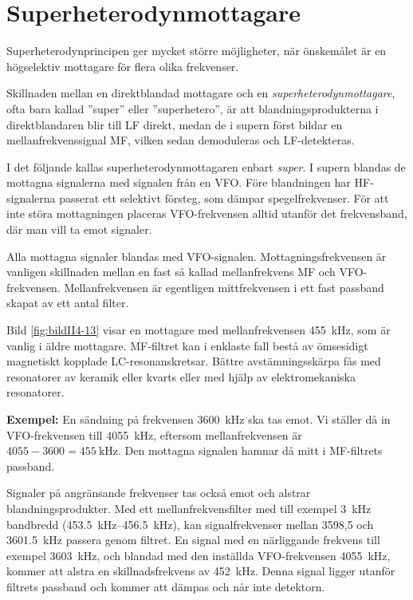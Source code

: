 \section{Superheterodynmottagare}

Superheterodynprincipen ger mycket större möjligheter, när önskemålet
är en högselektiv mottagare för flera olika frekvenser.

Skillnaden mellan en direktblandad mottagare och en
\emph{superheterodynmottagare}, ofta bara kallad ''super'' eller
''superhetero'', är att blandningsprodukterna i direktblandaren blir till
LF direkt, medan de i supern först bildar en mellanfrekvenssignal MF,
vilken sedan demoduleras och LF-detekteras.

I det följande kallas superheterodynmottagaren enbart \emph{super}.
I supern blandas de mottagna signalerna med signalen från en VFO.
Före blandningen har HF-signalerna passerat ett selektivt försteg, som
dämpar spegelfrekvenser.
För att inte störa mottagningen placeras VFO-frekvensen alltid utanför
det frekvensband, där man vill ta emot signaler.

Alla mottagna signaler blandas med VFO-signalen.
Mottagningsfrekvensen är vanligen skillnaden mellan en fast så kallad
mellanfrekvens MF och VFO-frekvensen.
Mellanfrekvensen är egentligen mittfrekvensen i ett fast passband skapat av
ett antal filter.


Bild \ref{fig:bildII4-13} visar en mottagare med mellanfrekvensen
\SI{455}{\kilo\hertz}, som är vanlig i äldre mottagare.
MF-filtret kan i enklaste fall bestå av ömsesidigt magnetiskt kopplade
LC-resonanskretsar.
Bättre avstämningsskärpa fås med resonatorer av keramik eller kvarts eller med
hjälp av elektromekaniska resonatorer.

\textbf{Exempel:}
En sändning på frekvensen \SI{3600}{\kilo\hertz} ska tas emot.
Vi ställer då in VFO-frekvensen till \SI{4055}{\kilo\hertz}, eftersom
mellanfrekvensen är \(4055 - 3600 = \SI{455}{\kilo\hertz}\).
Den mottagna signalen hamnar då mitt i MF-filtrets passband.

Signaler på angränsande frekvenser tas också emot och alstrar
blandningsprodukter.
Med ett mellanfrekvensfilter med till exempel \SI{3}{\kilo\hertz} bandbredd
(\SIrange{453,5}{456,5}{\kilo\hertz}), kan signalfrekvenser mellan 3598,5 och
\SI{3601,5}{\kilo\hertz} passera genom filtret.
En signal med en närliggande frekvens till exempel \SI{3603}{\kilo\hertz}, och
blandad med den inställda VFO-frekvensen \SI{4055}{\kilo\hertz}, kommer att
alstra en skillnadsfrekvens av \SI{452}{\kilo\hertz}.
Denna signal ligger utanför filtrets passband och kommer att dämpas och når
inte detektorn.

